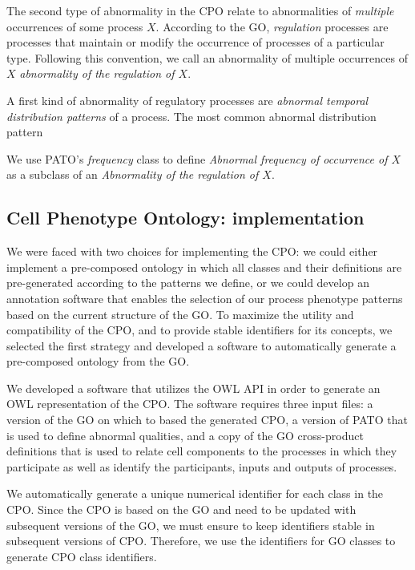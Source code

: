 \documentclass{bioinfo}
\renewcommand{\cite}{\citep}
\begin{document}
The second type of abnormality in the CPO relate to abnormalities of
{\em multiple} occurrences of some process $X$. According to the GO,
{\em regulation} processes are processes that maintain or modify the
occurrence of processes of a particular type. Following this
convention, we call an abnormality of multiple occurrences of $X$ {\em
  abnormality of the regulation of $X$}.

A first kind of abnormality of regulatory processes are {\em abnormal
  temporal distribution patterns} of a process. The most common
abnormal distribution pattern

We use PATO's {\em frequency} class to define {\em Abnormal frequency
  of occurrence of $X$} as a subclass of an {\em Abnormality of the
  regulation of $X$}.



\subsection{Cell Phenotype Ontology: implementation}
We were faced with two choices for implementing the CPO: we could
either implement a pre-composed ontology in which all classes and
their definitions are pre-generated according to the patterns we
define, or we could develop an annotation software that enables the
selection of our process phenotype patterns based on the current
structure of the GO.  To maximize the utility and compatibility of the
CPO, and to provide stable identifiers for its concepts, we selected
the first strategy and developed a software to automatically generate
a pre-composed ontology from the GO.

We developed a software that utilizes the OWL API \cite{Horridge2007}
in order to generate an OWL representation of the CPO. The software
requires three input files: a version of the GO on which to based the
generated CPO, a version of PATO that is used to define abnormal
qualities, and a copy of the GO cross-product definitions
\cite{Mungall2010go} that is used to relate cell components to the
processes in which they participate as well as identify the
participants, inputs and outputs of processes.

We automatically generate a unique numerical identifier for each class
in the CPO.  Since the CPO is based on the GO and need to be updated
with subsequent versions of the GO, we must ensure to keep identifiers
stable in subsequent versions of CPO. Therefore, we use the
identifiers for GO classes to generate CPO class identifiers.
\end{document}
